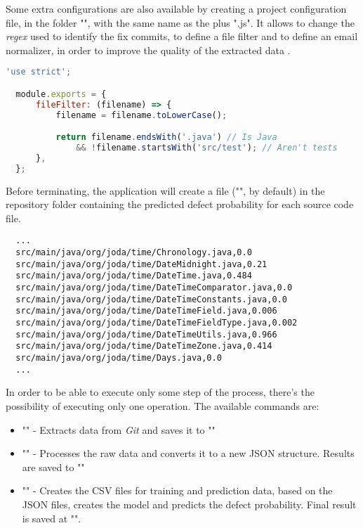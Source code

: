 Some extra configurations are also available by creating a project configuration file, in the folder "", with the same name as the  plus ".js".
It allows to change the \emph{regex} used to identify the fix commits, to define a file filter and to define an email normalizer, in order to improve the quality of the extracted data .

\begin{lstlisting}[language=Javascript]
  'use strict';

  module.exports = {
      fileFilter: (filename) => {
          filename = filename.toLowerCase();

          return filename.endsWith('.java') // Is Java
              && !filename.startsWith('src/test'); // Aren't tests
      },
  };
\end{lstlisting}

Before terminating, the application will create a file ("", by default) in the repository folder containing the predicted defect probability for each source code file.

\begin{lstlisting}
  ...
  src/main/java/org/joda/time/Chronology.java,0.0
  src/main/java/org/joda/time/DateMidnight.java,0.21
  src/main/java/org/joda/time/DateTime.java,0.484
  src/main/java/org/joda/time/DateTimeComparator.java,0.0
  src/main/java/org/joda/time/DateTimeConstants.java,0.0
  src/main/java/org/joda/time/DateTimeField.java,0.006
  src/main/java/org/joda/time/DateTimeFieldType.java,0.002
  src/main/java/org/joda/time/DateTimeUtils.java,0.966
  src/main/java/org/joda/time/DateTimeZone.java,0.414
  src/main/java/org/joda/time/Days.java,0.0
  ...
\end{lstlisting}


In order to be able to execute only some step of the process, there's the possibility of executing only one operation. The available commands are:
%
\begin{itemize}
\item "" - Extracts data from \emph{Git} and saves it to ""
\item "" - Processes the raw data and converts it to a new JSON structure. Results are saved to ""
\item "" - Creates the CSV files for training and prediction data, based on the JSON files, creates the model and predicts the defect probability.
Final result is saved at "".
\end{itemize}

